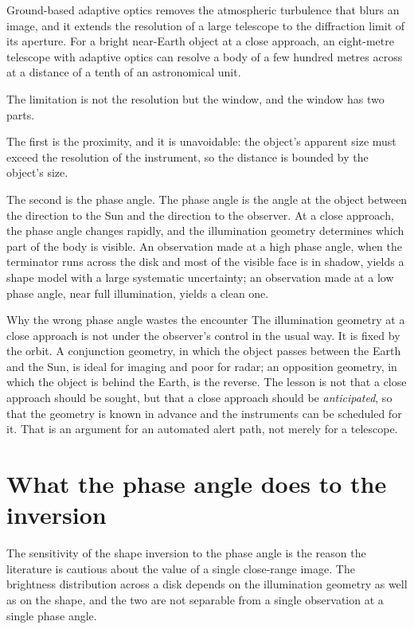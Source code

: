 Ground-based adaptive optics removes the atmospheric turbulence that blurs an
image, and it extends the resolution of a large telescope to the diffraction
limit of its aperture. For a bright near-Earth object at a close approach,
an eight-metre telescope with adaptive optics can resolve a body of a few
hundred metres across at a distance of a tenth of an astronomical unit.

The limitation is not the resolution but the window, and the window has two
parts.

The first is the proximity, and it is unavoidable: the object's apparent
size must exceed the resolution of the instrument, so the distance is
bounded by the object's size.

The second is the phase angle. The phase angle is the angle at the object
between the direction to the Sun and the direction to the observer. At a
close approach, the phase angle changes rapidly, and the illumination
geometry determines which part of the body is visible. An observation made
at a high phase angle, when the terminator runs across the disk and most of
the visible face is in shadow, yields a shape model with a large systematic
uncertainty; an observation made at a low phase angle, near full
illumination, yields a clean one.

\begin{deeper}{Why the wrong phase angle wastes the encounter}
The illumination geometry at a close approach is not under the observer's
control in the usual way. It is fixed by the orbit. A conjunction geometry,
in which the object passes between the Earth and the Sun, is ideal for
imaging and poor for radar; an opposition geometry, in which the object is
behind the Earth, is the reverse. The lesson is not that a close approach
should be sought, but that a close approach should be \emph{anticipated}, so
that the geometry is known in advance and the instruments can be scheduled
for it. That is an argument for an automated alert path, not merely for a
telescope.
\end{deeper}

\section{What the phase angle does to the inversion}

The sensitivity of the shape inversion to the phase angle is the reason the
literature is cautious about the value of a single close-range image. The
brightness distribution across a disk depends on the illumination geometry
as well as on the shape, and the two are not separable from a single
observation at a single phase angle.

